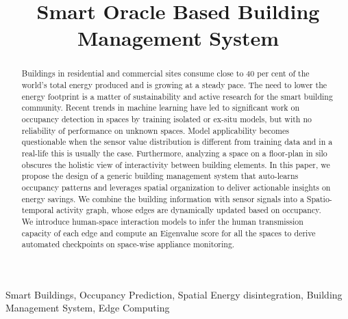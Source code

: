 \documentclass[conference]{IEEEtran}
\begin{document}
\title{Smart Oracle Based Building Management System }

\author{
\and
{}
\and
{}

}

\maketitle

\begin{abstract}
Buildings in residential and commercial sites consume close to 40 per cent of the world’s total energy produced and is growing at a steady pace. The need to lower the energy footprint is a matter of sustainability and active research for the smart building community. Recent trends in machine learning have led to significant work on occupancy detection in spaces by training isolated or ex-situ models, but with no reliability of performance on unknown spaces. Model applicability becomes questionable when the sensor value distribution is different from training data and in a real-life this is usually the case. Furthermore, analyzing a space on a floor-plan in silo obscures the holistic view of interactivity between building elements. In this paper, we propose the design of a generic building management system that auto-learns occupancy patterns and leverages spatial organization to deliver actionable insights on energy savings. We combine the building information with sensor signals into a Spatio-temporal activity graph, whose edges are dynamically updated based on occupancy. We introduce human-space interaction models to infer the human transmission capacity of each edge and compute an Eigenvalue score for all the spaces to derive automated checkpoints on space-wise appliance monitoring.


\end{abstract}

\begin{IEEEkeywords}
Smart Buildings, Occupancy Prediction, Spatial Energy disintegration, Building Management System, Edge Computing
\end{IEEEkeywords}
\end{document}
